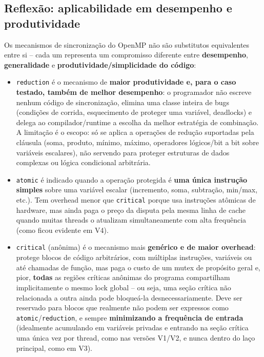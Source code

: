 \documentclass[a4paper,12pt]{article}
\begin{document}
\subsection{Reflexão: aplicabilidade em desempenho e produtividade}

Os mecanismos de sincronização do OpenMP não são substitutos
equivalentes entre si -- cada um representa um compromisso diferente
entre \textbf{desempenho}, \textbf{generalidade} e
\textbf{produtividade/simplicidade do código}:

\begin{itemize}
    \item \texttt{reduction} é o mecanismo de \textbf{maior
    produtividade e, para o caso testado, também de melhor
    desempenho}: o programador não escreve nenhum código de
    sincronização, elimina uma classe inteira de bugs (condições de
    corrida, esquecimento de proteger uma variável, deadlocks) e
    delega ao compilador/runtime a escolha da melhor estratégia de
    combinação. A limitação é o escopo: só se aplica a operações de
    redução suportadas pela cláusula (soma, produto, mínimo, máximo,
    operadores lógicos/bit a bit sobre variáveis escalares), não
    servendo para proteger estruturas de dados complexas ou lógica
    condicional arbitrária.

    \item \texttt{atomic} é indicado quando a operação protegida é
    \textbf{uma única instrução simples} sobre uma variável escalar
    (incremento, soma, subtração, min/max, etc.). Tem
    overhead menor que \texttt{critical} porque usa instruções
    atômicas de hardware, mas ainda paga o preço da disputa pela
    mesma linha de cache quando muitas threads o atualizam
    simultaneamente com alta frequência (como ficou evidente em V4).

    \item \texttt{critical} (anônima) é o mecanismo mais
    \textbf{genérico e de maior overhead}: protege blocos de código
    arbitrários, com múltiplas instruções, variáveis ou até chamadas
    de função, mas paga o custo de um mutex de propósito geral e,
    pior, \textbf{todas} as regiões críticas anônimas do programa
    compartilham implicitamente o mesmo lock global -- ou seja, uma
    seção crítica não relacionada a outra ainda pode bloqueá-la
    desnecessariamente. Deve ser reservado para blocos que realmente
    não podem ser expressos como \texttt{atomic}/\texttt{reduction}, e
    sempre \textbf{minimizando a frequência de entrada} (idealmente
    acumulando em variáveis privadas e entrando na seção crítica uma
    única vez por thread, como nas versões V1/V2, e nunca dentro do
    laço principal, como em V3).


\end{itemize}
\end{document}
